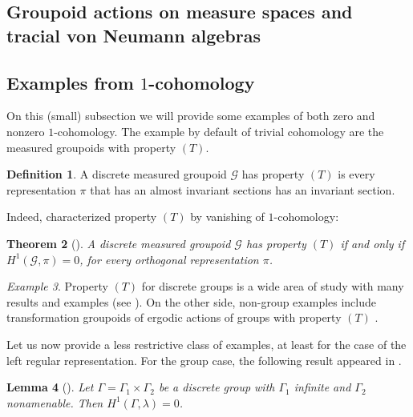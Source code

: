 \documentclass[a4paper,11pt]{article}
\numberwithin{equation}{section}
\newtheorem{thm}{Theorem}[section]
\newtheorem{lem}[thm]{Lemma}
\theoremstyle{definition}
\newtheorem{defn}[thm]{Definition}
\theoremstyle{remark}
\newtheorem{ex}[thm]{Example}
\numberwithin{equation}{section}
\newcommand{\rG}{\mathcal{G}}
\numberwithin{equation}{section}
\begin{document}
\subsection{Groupoid actions on measure spaces and tracial von Neumann algebras}




\subsection{Examples from $1$-cohomology}

On this (small) subsection we will provide some examples of both zero and nonzero $1$-cohomology. The example by default of trivial cohomology are the measured groupoids with property $(T)$. 

\begin{defn}
    A discrete measured groupoid $\rG$ has property $(T)$ is every representation $\pi$ that has an almost invariant sections has an invariant section.
\end{defn}

Indeed, \textcite[Theorems 4.8, 4.12]{anatharaman:05} characterized property $(T)$ by vanishing of $1$-cohomology:

\begin{thm}[\cite{anatharaman:05}]
    A discrete measured groupoid $\rG$ has property $(T)$ if and only if $H^1(\rG,\pi)=0$, for every orthogonal representation $\pi$.
\end{thm}

\begin{ex}
    Property $(T)$ for discrete groups is a wide area of study with many results and examples (see \cite{Tbook}). On the other side, non-group examples include transformation groupoids of ergodic actions of groups with property $(T)$ \cite[Theorem 2.16]{lupini:18}. 
\end{ex}

Let us now provide a less restrictive class of examples, at least for the case of the left regular representation. For the group case, the following result appeared in \cite{peterson:06,BeVa}.


\begin{lem}[\textcite{peterson:06}]
  Let $ \Gamma = \Gamma_{1}\times \Gamma_{2} $ be a discrete group with $ \Gamma_{1} $ infinite and $ \Gamma_{2} $ nonamenable. Then $ H^{1}(\Gamma, \lambda) = 0 $.
\end{lem}
\end{document}
